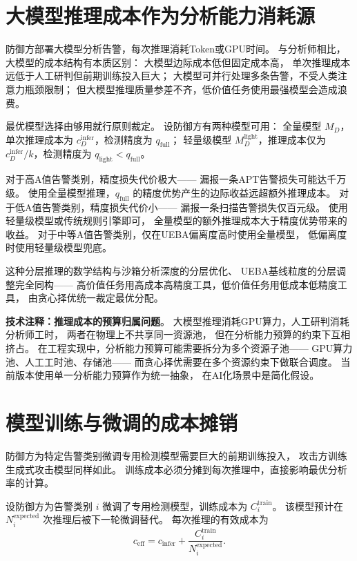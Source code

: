 \documentclass[11pt,a4paper]{article}
\begin{document}
\section{大模型推理成本作为分析能力消耗源}

防御方部署大模型分析告警，每次推理消耗Token或GPU时间。
与分析师相比，大模型的成本结构有本质区别：
大模型边际成本低但固定成本高，
单次推理成本远低于人工研判但前期训练投入巨大；
大模型可并行处理多条告警，不受人类注意力瓶颈限制；
但大模型推理质量参差不齐，低价值任务使用最强模型会造成浪费。

最优模型选择由够用就行原则裁定。
设防御方有两种模型可用：
全量模型 \(M_D\)，单次推理成本为 \(c_D^{\text{infer}}\)，检测精度为 \(q_{\text{full}}\)；
轻量级模型 \(M_D^{\text{light}}\)，推理成本仅为 \(c_D^{\text{infer}}/k\)，检测精度为 \(q_{\text{light}} < q_{\text{full}}\)。

对于高A值告警类别，精度损失代价极大——
漏报一条APT告警损失可能达千万级。
使用全量模型推理，\(q_{\text{full}}\) 的精度优势产生的边际收益远超额外推理成本。
对于低A值告警类别，精度损失代价小——
漏报一条扫描告警损失仅百元级。
使用轻量级模型或传统规则引擎即可，
全量模型的额外推理成本大于精度优势带来的收益。
对于中等A值告警类别，仅在UEBA偏离度高时使用全量模型，
低偏离度时使用轻量级模型兜底。

这种分层推理的数学结构与沙箱分析深度的分层优化、
UEBA基线粒度的分层调整完全同构——
高价值任务用高成本高精度工具，低价值任务用低成本低精度工具，
由贪心择优统一裁定最优分配。

\textbf{技术注释：推理成本的预算归属问题}。
大模型推理消耗GPU算力，人工研判消耗分析师工时，
两者在物理上不共享同一资源池，
但在分析能力预算的约束下互相挤占。
在工程实现中，分析能力预算可能需要拆分为多个资源子池——
GPU算力池、人工工时池、存储池——
而贪心择优需要在多个资源约束下做联合调度。
当前版本使用单一分析能力预算作为统一抽象，
在AI化场景中是简化假设。

\section{模型训练与微调的成本摊销}

防御方为特定告警类别微调专用检测模型需要巨大的前期训练投入，
攻击方训练生成式攻击模型同样如此。
训练成本必须分摊到每次推理中，直接影响最优分析率的计算。

设防御方为告警类别 \(i\) 微调了专用检测模型，训练成本为 \(C_i^{\text{train}}\)。
该模型预计在 \(N_i^{\text{expected}}\) 次推理后被下一轮微调替代。
每次推理的有效成本为
\[
c_{\text{eff}} = c_{\text{infer}} + \frac{C_i^{\text{train}}}{N_i^{\text{expected}}}.
\]
\end{document}

